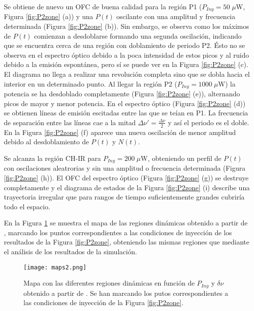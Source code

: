 			Se obtiene de nuevo un OFC de buena calidad para la región P1 ($P_{Iny} = 50\;\mu$W, Figura \ref{fig:P2zone} (a)) y una $P(t)$ oscilante con una amplitud y frecuencia determinada (Figura \ref{fig:P2zone} (b)). Sin embargo, se observa como los máximos de $P(t)$ comienzan a desdoblarse formando una segunda oscilación, indicando que se encuentra cerca de una región con doblamiento de periodo P2. Ésto no se observa en el espectro óptico debido a la poca intensidad de estos picos y al ruido debido a la emisión espontánea, pero sí se puede ver en la Figura \ref{fig:P2zone} (c). El diagrama no llega a realizar una revolución completa sino que se dobla hacia el interior en un determinado punto. Al llegar la región P2 ($P_{Iny} = 1000\;\mu$W) la potencia se ha desdoblado completamente (Figura \ref{fig:P2zone} (e)), alternando picos de mayor y menor potencia. En el espectro óptico (Figura \ref{fig:P2zone} (d)) se obtienen líneas de emisión escitadas entre las que se teían en P1. La frecuencia de separación entre las líneas cae a la mitad $\Delta \nu' = \frac{\Delta\nu}{2}$ y así el periodo es el doble. En la Figura \ref{fig:P2zone} (f) aparece una nueva oscilación de menor amplitud debido al desdoblamiento de $P(t)$ y $N(t)$.

		Se alcanza la región CH-IR para $P_{Iny} = 200\;\mu$W, obteniendo un perfil de $P(t)$ con oscilaciones aleatrorias y sin una amplitud o frecuencia determinada (Figura \ref{fig:P2zone} (h)). El OFC del espectro óptico (Figura \ref{fig:P2zone} (g)) se destruye completamente y el diagrama de estados de la Figura \ref{fig:P2zone} (i) describe una trayectoria irregular que para rangos de tiempo suficientemente grandes cubriría todo el espacio. 

		En la Figura \ref{fig:maps2} se muestra el mapa de las regiones dinámicas obtenido a partir de \cite{Chaves19}, marcando los puntos correspondientes a las condiciones de inyección de los resultados de la Figura \ref{fig:P2zone}, obteniendo las mismas regiones que mediante el análisis de los resultados de la simulación.

			\begin{figure}[H]
				\centering
				\texttt{[image: maps2.png]}
				\caption{\label{fig:maps2}Mapa con las diferentes regiones dinámicas en función de $P_{Iny}$ y $\delta\nu$ obtenido a partir de \cite{Chaves19}. Se han marcando los putos correspondientes a las condiciones de inyección de la Figura \ref{fig:P2zone}.}	
			\end{figure}
